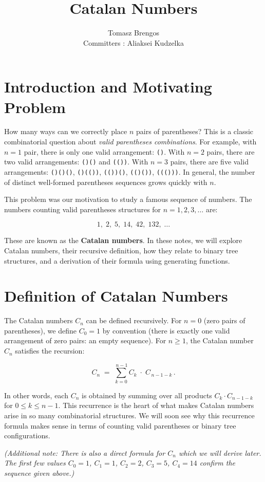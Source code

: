 \documentclass[docmute]{article}
\title{Catalan Numbers}
\author{Tomasz Brengos \\  
Committers : Aliaksei Kudzelka}
\date{}
\begin{document}
\maketitle
\section{Introduction and Motivating Problem}

How many ways can we correctly place $n$ pairs of parentheses? This is a classic combinatorial question about \emph{valid parentheses combinations}. For example, with $n=1$ pair, there is only one valid arrangement: \texttt{()}. With $n=2$ pairs, there are two valid arrangements: \texttt{()()} and \texttt{(())}. With $n=3$ pairs, there are five valid arrangements: \texttt{()()()}, \texttt{()(())}, \texttt{(())()}, \texttt{(()())}, \texttt{((()))}. In general, the number of distinct well-formed parentheses sequences grows quickly with $n$.

This problem was our motivation to study a famous sequence of numbers. The numbers counting valid parentheses structures for $n=1,2,3,\dots$ are:

\[1,\; 2,\; 5,\; 14,\; 42,\; 132,\;\dots\]

These are known as the \textbf{Catalan numbers}. In these notes, we will explore Catalan numbers, their recursive definition, how they relate to binary tree structures, and a derivation of their formula using generating functions.

\section{Definition of Catalan Numbers}

The Catalan numbers $C_n$ can be defined recursively. For $n=0$ (zero pairs of parentheses), we define $C_0 = 1$ by convention (there is exactly one valid arrangement of zero pairs: an empty sequence). For $n\ge 1$, the Catalan number $C_n$ satisfies the recursion:

\[
C_n \;=\; \sum_{k=0}^{\,n-1} C_k \;\cdot\; C_{\,n-1-k}\,.
\]

In other words, each $C_n$ is obtained by summing over all products $C_k \cdot C_{n-1-k}$ for $0 \le k \le n-1$. This recurrence is the heart of what makes Catalan numbers arise in so many combinatorial structures. We will soon see why this recurrence formula makes sense in terms of counting valid parentheses or binary tree configurations.

\textit{(Additional note: There is also a direct formula for $C_n$ which we will derive later. The first few values $C_0=1$, $C_1=1$, $C_2=2$, $C_3=5$, $C_4=14$ confirm the sequence given above.)}
\end{document}
